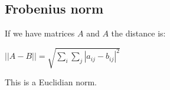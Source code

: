 
\subsection{Frobenius norm}

If we have matrices \(A\) and \(A\) the distance is:

\(||A-B||=\sqrt {\sum_i \sum_j |a_{ij}-b_{ij}|^2}\)

This is a Euclidian norm.

